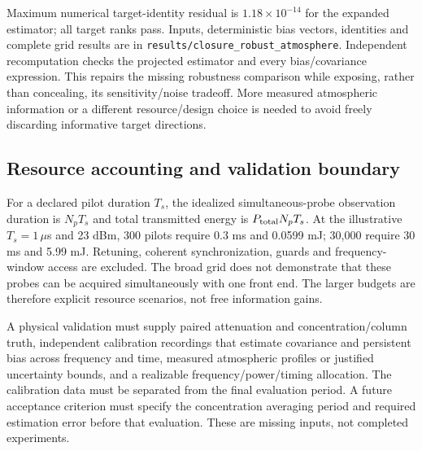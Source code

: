 \documentclass[conference]{IEEEtran}
\begin{document}
Maximum numerical target-identity residual is $1.18\times10^{-14}$ for the expanded estimator; all target ranks pass. Inputs, deterministic bias vectors, identities and complete grid results are in \texttt{results/closure\_robust\_atmosphere}. Independent recomputation checks the projected estimator and every bias/covariance expression. This repairs the missing robustness comparison while exposing, rather than concealing, its sensitivity/noise tradeoff. More measured atmospheric information or a different resource/design choice is needed to avoid freely discarding informative target directions.

\subsection{Resource accounting and validation boundary}
For a declared pilot duration $T_s$, the idealized simultaneous-probe observation duration is $N_pT_s$ and total transmitted energy is $P_{\rm total}N_pT_s$. At the illustrative $T_s=1\,\mu$s and 23 dBm, 300 pilots require 0.3 ms and 0.0599 mJ; 30,000 require 30 ms and 5.99 mJ. Retuning, coherent synchronization, guards and frequency-window access are excluded. The broad grid does not demonstrate that these probes can be acquired simultaneously with one front end. The larger budgets are therefore explicit resource scenarios, not free information gains.

A physical validation must supply paired attenuation and concentration/column truth, independent calibration recordings that estimate covariance and persistent bias across frequency and time, measured atmospheric profiles or justified uncertainty bounds, and a realizable frequency/power/timing allocation. The calibration data must be separated from the final evaluation period. A future acceptance criterion must specify the concentration averaging period and required estimation error before that evaluation. These are missing inputs, not completed experiments.
\end{document}
